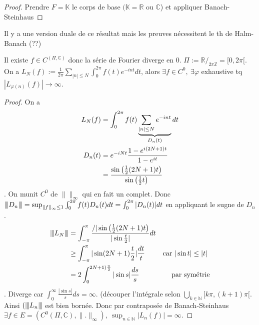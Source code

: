 \begin{proof}
    Prendre $F=\mathbb{K}$ le corps de base $(\mathbb{K}=\mathbb{R} $ ou $\mathbb{C}$) et appliquer Banach-Steinhaus
\end{proof}
\begin{remarque}
    Il y a une version duale de ce résultat mais les preuves nécessitent le th de Halm-Banach (??)
\end{remarque}
\begin{ex}
    Il existe $f\in C^ (\Pi,\mathbb{C})$ donc la série de Fourier diverge en 0. $\Pi:=\mathbb{R} /_{2\pi\mathbb{Z} }=[0,2\pi[$. On a $L_N(f):=\frac{1}{2\pi}\sum\limits_{|n|\le N}^{} \int_0^{2\pi}f(t)e^{-int}dt$, alors $\exists f\in C^0,\ \exists \varphi $ exhaustive tq $|L_{\varphi (n)}(f)|\to \infty $.
\end{ex}
\begin{proof}
    On a
     \begin{align*}
         L_N(f)&=\int_0^{2\pi}f(t)\underbrace{\sum\limits_{|n|\le N}^{} e^{-i nt}}_{\mathclap{D_n(t)}}dt\\
         D_n(t)&=e^{-i Nt}\frac{1-e^{i(2N+1)t}}{1-e^{it}}\\
               &=\frac{\sin \left( \frac{1}{2}(2N+1)t \right) }{\sin\left( \frac{1}{2}t \right) }
     \end{align*}.
     On munit $C^0$ de $\|\|_\infty $ qui en fait un complet. Donc ${\left\vert\kern-0.25ex\left\vert\kern-0.25ex\left\vert D_n \right\vert\kern-0.25ex\right\vert\kern-0.25ex\right\vert}=\sup_{\|f\|_\infty \le 1}\int_0^{2\pi}f(t)D_n(t)dt=\int_0^{2\pi}|D_n(t)|dt$ en appliquant le sugne de $D_n$.\\
      \begin{align*}
          {\left\vert\kern-0.25ex\left\vert\kern-0.25ex\left\vert L_N \right\vert\kern-0.25ex\right\vert\kern-0.25ex\right\vert}&=\int_{-\pi}^\pi\frac{/|\sin\left( \frac{1}{2}(2N+1)t \right) }{|\sin \frac{t}{2}|}dt\\
                       &\ge \int_{-\pi}^\pi |\sin(2N+1)\frac{t}{2}|\frac{dt}{t} &\text{car $|\sin t|\le |t|$ }\\
                       &= 2\int_0^{2N+1)\frac{\pi}{2}}|\sin s|\frac{ds}{s} &\text{par symétrie}
     \end{align*}.
     Diverge car $\int _0^\infty \frac{|\sin s|}{s}ds=\infty .$ (découper l'intégrale selon $\bigcup\limits_{k\in \mathbb{N} } [k\pi,(k+1)\pi[.$ \\
     Ainsi $({\left\vert\kern-0.25ex\left\vert\kern-0.25ex\left\vert L_n \right\vert\kern-0.25ex\right\vert\kern-0.25ex\right\vert}$ est bien bornée. Donc par contraposée de Banach-Steinhaus $\exists f\in E=(C^0(\Pi,\mathbb{C}),\|.\|_\infty ),\ \sup_{n\in \mathbb{N} }|L_n(f)|=\infty .$
\end{proof}


